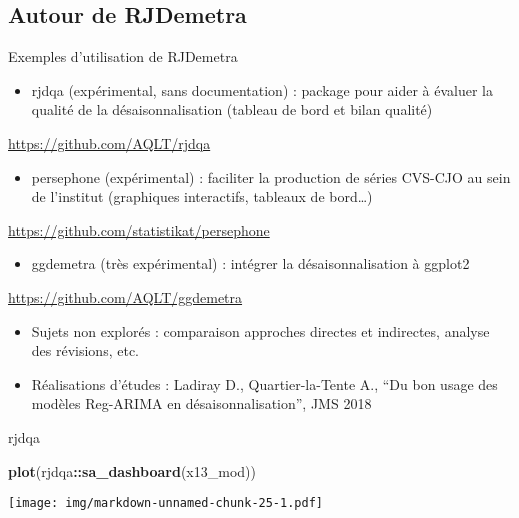 \documentclass[10pt,xcolor=table,color={dvipsnames,usenames},ignorenonframetext,usepdftitle=false,french]{beamer}
\newenvironment{Shaded}{\begin{snugshade}}{\end{snugshade}}
\newcommand{\KeywordTok}[1]{\textcolor[rgb]{0.13,0.29,0.53}{\textbf{#1}}}
\newcommand{\NormalTok}[1]{#1}
\newcommand{\OperatorTok}[1]{\textcolor[rgb]{0.81,0.36,0.00}{\textbf{#1}}}
\providecommand{\tightlist}{%
  \setlength{\parskip}{0pt}
  }
\begin{document}
\hypertarget{autour-de-rjdemetra}{%
\subsection{Autour de RJDemetra}\label{autour-de-rjdemetra}}

\begin{frame}{Exemples d'utilisation de RJDemetra}
\protect\hypertarget{exemples-dutilisation-de-rjdemetra}{}

\begin{itemize}
\tightlist
\item
  rjdqa (expérimental, sans documentation) : package pour aider à
  évaluer la qualité de la désaisonnalisation (tableau de bord et bilan
  qualité)
\end{itemize}

\faGithub{} \url{https://github.com/AQLT/rjdqa}

\begin{itemize}
\tightlist
\item
  persephone (expérimental) : faciliter la production de séries CVS-CJO
  au sein de l'institut (graphiques interactifs, tableaux de
  bord\ldots{})
\end{itemize}

\faGithub{} \url{https://github.com/statistikat/persephone}

\begin{itemize}
\tightlist
\item
  ggdemetra (très expérimental) : intégrer la désaisonnalisation à
  ggplot2
\end{itemize}

\faGithub{} \url{https://github.com/AQLT/ggdemetra}

\begin{itemize}
\item
  Sujets non explorés : comparaison approches directes et indirectes,
  analyse des révisions, etc.
\item
  Réalisations d'études : Ladiray D., Quartier-la-Tente A., ``Du bon
  usage des modèles Reg-ARIMA en désaisonnalisation'', JMS 2018
\end{itemize}

\end{frame}

\begin{frame}[fragile]{rjdqa}
\protect\hypertarget{rjdqa}{}

\footnotesize

\begin{Shaded}
\begin{Highlighting}[]
\KeywordTok{plot}\NormalTok{(rjdqa}\OperatorTok{::}\KeywordTok{sa_dashboard}\NormalTok{(x13_mod))}
\end{Highlighting}
\end{Shaded}

\texttt{[image: img/markdown-unnamed-chunk-25-1.pdf]}

\end{frame}
\end{document}
